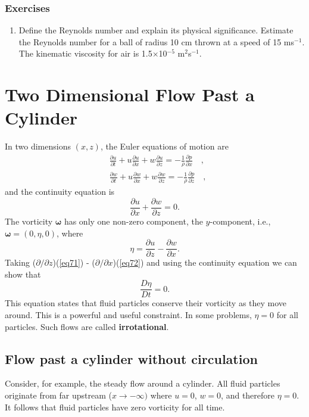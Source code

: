 \documentclass[twoside,a4paper,11pt]{report}
\begin{document}
\subsection*{Exercises}
\begin{enumerate}
\item Define the Reynolds number and explain its physical significance. 
Estimate the Reynolds number for a ball of radius 10 cm thrown at a speed of 
15 ms$^{-1}$. The kinematic viscosity for air is 1.5$\times $10$^{-5}$ 
m$^{2}$s$^{-1}$.
\end{enumerate}

\chapter{Two Dimensional Flow Past a Cylinder}
In two dimensions $(x, z)$, the Euler equations of motion are
\begin{align}
& \frac{\partial u}{\partial t}+u\frac{\partial u}{\partial 
x}+w\frac{\partial u}{\partial z}=-\frac{1}{\rho }\frac{\partial 
p}{\partial x}\quad , \label{eq71} \\
& \frac{\partial w}{\partial t}+u\frac{\partial w}{\partial 
x}+w\frac{\partial w}{\partial z}=-\frac{1}{\rho }\frac{\partial 
p}{\partial z}\quad , \label{eq72}
\end{align}
and the continuity equation is
\begin{equation}
\label{eq73}
\frac{\partial u}{\partial x}+\frac{\partial w}{\partial z}=0 .
\end{equation}
The vorticity ${\bm\omega}$ has only one non-zero component, the 
$y$-component, i.e., ${\bm\omega}= (0, \eta , 0)$, where
\begin{equation}
\label{eq74}
\eta =\frac{\partial u}{\partial z}-\frac{\partial w}{\partial x}.
\end{equation}
Taking ($\partial /\partial z$)(\ref{eq71}) - ($\partial /\partial x$)(\ref{eq72}) and 
using the continuity equation we can show that 
\begin{equation}
\label{eq75}
\frac{D\eta }{Dt}=0.
\end{equation}
This equation states that fluid particles conserve their vorticity as they 
move around. This is a powerful and useful constraint. In some problems, 
$\eta  = 0$ for all particles. Such flows are called \textbf{irrotational}.

\section{Flow past a cylinder without circulation}
Consider, for example, the steady flow around a cylinder.  All fluid particles originate from far upstream ($x 
\to -\infty )$ where $u = 0$, $w = 0$,
and therefore $\eta  = 0$. It follows that fluid particles have zero 
vorticity for all time.
\end{document}
